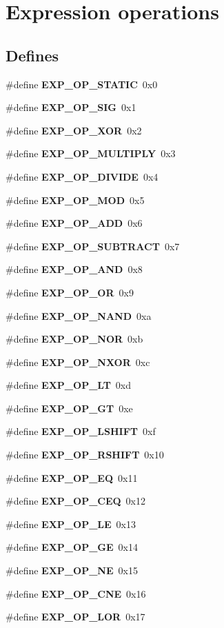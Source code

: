 \section{Expression operations}
\label{group__expr__ops}
\subsection*{Defines}
\begin{CompactItemize}
\item 
\#define {\bf EXP\_\-OP\_\-STATIC}\ 0x0
\item 
\#define {\bf EXP\_\-OP\_\-SIG}\ 0x1
\item 
\#define {\bf EXP\_\-OP\_\-XOR}\ 0x2
\item 
\#define {\bf EXP\_\-OP\_\-MULTIPLY}\ 0x3
\item 
\#define {\bf EXP\_\-OP\_\-DIVIDE}\ 0x4
\item 
\#define {\bf EXP\_\-OP\_\-MOD}\ 0x5
\item 
\#define {\bf EXP\_\-OP\_\-ADD}\ 0x6
\item 
\#define {\bf EXP\_\-OP\_\-SUBTRACT}\ 0x7
\item 
\#define {\bf EXP\_\-OP\_\-AND}\ 0x8
\item 
\#define {\bf EXP\_\-OP\_\-OR}\ 0x9
\item 
\#define {\bf EXP\_\-OP\_\-NAND}\ 0xa
\item 
\#define {\bf EXP\_\-OP\_\-NOR}\ 0xb
\item 
\#define {\bf EXP\_\-OP\_\-NXOR}\ 0xc
\item 
\#define {\bf EXP\_\-OP\_\-LT}\ 0xd
\item 
\#define {\bf EXP\_\-OP\_\-GT}\ 0xe
\item 
\#define {\bf EXP\_\-OP\_\-LSHIFT}\ 0xf
\item 
\#define {\bf EXP\_\-OP\_\-RSHIFT}\ 0x10
\item 
\#define {\bf EXP\_\-OP\_\-EQ}\ 0x11
\item 
\#define {\bf EXP\_\-OP\_\-CEQ}\ 0x12
\item 
\#define {\bf EXP\_\-OP\_\-LE}\ 0x13
\item 
\#define {\bf EXP\_\-OP\_\-GE}\ 0x14
\item 
\#define {\bf EXP\_\-OP\_\-NE}\ 0x15
\item 
\#define {\bf EXP\_\-OP\_\-CNE}\ 0x16
\item 
\#define {\bf EXP\_\-OP\_\-LOR}\ 0x17
\item 

\end{CompactItemize}
